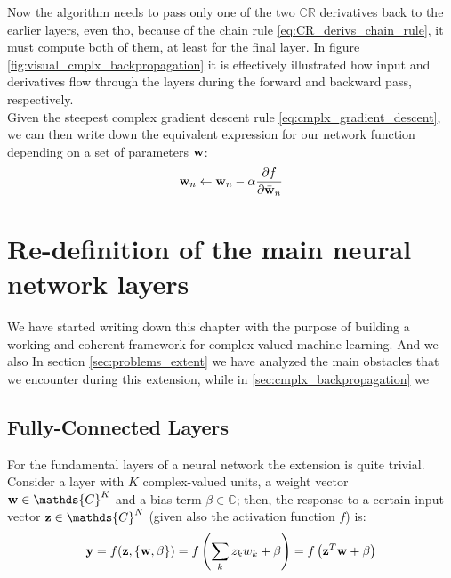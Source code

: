 \documentclass[../main.tex]{subfiles}
\begin{document}
Now the algorithm needs to pass only one of the two $\mathds{CR}$ derivatives back to the earlier layers, even tho, because of the chain rule \ref{eq:CR_derivs_chain_rule}, it must compute both of them, at least for the final layer. In figure \ref{fig:visual_cmplx_backpropagation} it is effectively illustrated how input and derivatives flow through the layers during the forward and backward pass, respectively.\\
Given the steepest complex gradient descent rule \ref{eq:cmplx_gradient_descent}, we can then write down the equivalent expression for our network function depending on a set of parameters $\vb{w}$:
\[ \vb{w}_n \leftarrow \vb{w}_n - \alpha\pdv{f}{\bar{\vb{w}}_n} \]

\section{Re-definition of the main neural network layers}

We have started writing down this chapter with the purpose of building a working and coherent framework for complex-valued machine learning. And we also 
In section \ref{sec:problems_extent} we have analyzed the main obstacles that we encounter during this extension, while in \ref{sec:cmplx_backpropagation} we 

\subsection*{Fully-Connected Layers}
\label{subsec:linear_layers}

For the fundamental layers of a neural network the extension is quite trivial. Consider a layer with $K$ complex-valued units, a weight vector $\vb{w}\in\mathds{C}^K$ and a bias term $\beta\in\mathds{C}$; then, the response to a certain input vector $\vb{z}\in\mathds{C}^N$ (given also the activation function $f$) is:
\[ \vb{y} = f(\vb{z}, \left\{\vb{w},\beta\right\}) = f\left(\sum_k z_kw_k + \beta\right) = f\left(\vb{z}^T\vb{w} + \beta\right) \]
\end{document}
